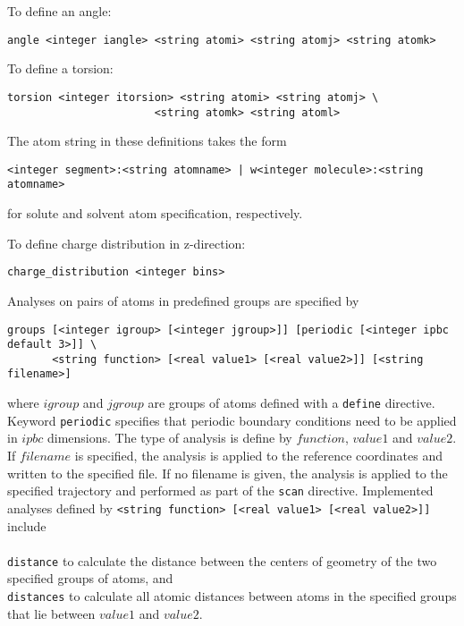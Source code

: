 To define an angle:

\begin{verbatim}
angle <integer iangle> <string atomi> <string atomj> <string atomk> 
\end{verbatim}

To define a torsion:

\begin{verbatim}
torsion <integer itorsion> <string atomi> <string atomj> \
                       <string atomk> <string atoml> 
\end{verbatim}

The atom string in these definitions takes the form

\begin{verbatim}
<integer segment>:<string atomname> | w<integer molecule>:<string atomname>
\end{verbatim}

for solute and solvent atom specification, respectively.

To define charge distribution in z-direction:

\begin{verbatim}
charge_distribution <integer bins>
\end{verbatim}

Analyses on pairs of atoms in predefined groups are specified by

\begin{verbatim}
groups [<integer igroup> [<integer jgroup>]] [periodic [<integer ipbc default 3>]] \ 
       <string function> [<real value1> [<real value2>]] [<string filename>]
\end{verbatim}

where $igroup$ and $jgroup$ are groups of atoms defined with a
\verb+define+ directive. Keyword \verb+periodic+ specifies that
periodic boundary conditions need to be applied in $ipbc$ dimensions.
The type of analysis is define by $function$, $value1$ and $value2$.
If $filename$ is specified, the analysis is applied to the reference
coordinates and written to the specified file. If no filename is
given, the analysis is applied to the specified trajectory and 
performed as part of the \verb+scan+ directive.
Implemented analyses defined by 
\verb+<string function> [<real value1> [<real value2>]]+ include\\
\\
\verb+distance+ to calculate the distance between the centers of geometry of the 
two specified groups of atoms, and\\
\verb+distances+ to calculate all atomic distances between atoms
in the specified groups that lie between $value1$ and $value2$.

